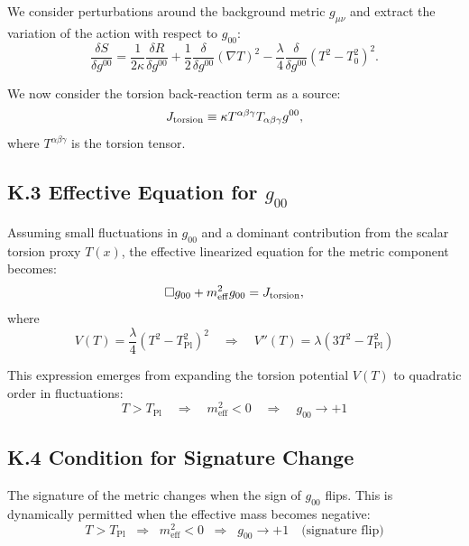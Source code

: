 \documentclass{article}
\begin{document}
We consider perturbations around the background metric $g_{\mu\nu}$ and extract the variation of the action with respect to $g_{00}$:
\begin{equation}
\frac{\delta S}{\delta g^{00}} = \frac{1}{2\kappa} \frac{\delta R}{\delta g^{00}} + \frac{1}{2} \frac{\delta}{\delta g^{00}} \left(\nabla T\right)^2 - \frac{\lambda}{4} \frac{\delta}{\delta g^{00}} (T^2 - T_0^2)^2.
\end{equation}

We now consider the torsion back-reaction term as a source:
\begin{equation}
J_{\rm torsion} \equiv \kappa T^{\alpha\beta\gamma} T_{\alpha\beta\gamma} g^{00},
\end{equation}
where $T^{\alpha\beta\gamma}$ is the torsion tensor.

\subsection*{K.3 Effective Equation for $g_{00}$}
Assuming small fluctuations in $g_{00}$ and a dominant contribution from the scalar torsion proxy $T(x)$, the effective linearized equation for the metric component becomes:
\begin{equation}
\square g_{00} + m_{\rm eff}^2 g_{00} = J_{\rm torsion},
\end{equation}
where
\begin{equation}
V(T) = \frac{\lambda}{4}(T^2 - T_{\mathrm{Pl}}^2)^2 \quad \Rightarrow \quad V''(T) = \lambda(3T^2 - T_{\mathrm{Pl}}^2)
\end{equation}

This expression emerges from expanding the torsion potential $V(T)$ to quadratic order in fluctuations:
\begin{equation}
T > T_{\mathrm{Pl}} \quad \Rightarrow \quad m_\text{eff}^2 < 0 \quad \Rightarrow \quad g_{00} \to +1
\end{equation}

\subsection*{K.4 Condition for Signature Change}
The signature of the metric changes when the sign of $g_{00}$ flips. This is dynamically permitted when the effective mass becomes negative:
\begin{equation}
\boxed{
T > T_{\mathrm{Pl}} \;\; \Rightarrow \;\; m_{\mathrm{eff}}^2 < 0 \;\; \Rightarrow \;\; g_{00} \rightarrow +1 \quad \text{(signature flip)}
}
\end{equation}
\end{document}
